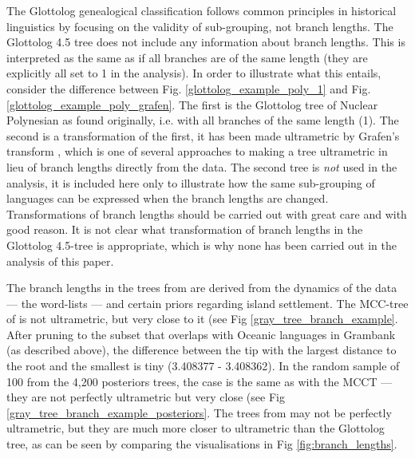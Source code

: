 \documentclass[12pt,letterpaper]{article}
\begin{document}
The Glottolog genealogical classification follows common principles in historical linguistics by focusing on the validity of sub-grouping, not branch lengths. The Glottolog 4.5 tree does not include any information about branch lengths. This is interpreted as the same as if all branches are of the same length (they are explicitly all set to 1 in the analysis). In order to illustrate what this entails, consider the difference between Fig. \ref{glottolog_example_poly_1} and Fig. \ref{glottolog_example_poly_grafen}. The first is the Glottolog tree of Nuclear Polynesian as found originally, i.e. with all branches of the same length (1). The second is a transformation of the first, it has been made ultrametric by Grafen's transform \citep{grafen1989phylogenetic}, which is one of several approaches to making a tree ultrametric in lieu of branch lengths directly from the data. The second tree is \emph{not} used in the analysis, it is included here only to illustrate how the same sub-grouping of languages can be expressed when the branch lengths are changed. Transformations of branch lengths should be carried out with great care and with good reason. It is not clear what transformation of branch lengths in the Glottolog 4.5-tree is appropriate, which is why none has been carried out in the analysis of this paper.

The branch lengths in the trees from \citet{grayetal_2009} are derived from the dynamics of the data --- the word-lists --- and certain priors regarding island settlement. The MCC-tree of \citet{grayetal_2009} is not ultrametric, but very close to it (see Fig \ref{gray_tree_branch_example}. After pruning to the subset that overlaps with Oceanic languages in Grambank (as described above), the difference between the tip with the largest distance to the root and the smallest is tiny (3.408377 -  3.408362). In the random sample of 100 from the 4,200 posteriors trees, the case is the same as with the MCCT --- they are not perfectly ultrametric but very close (see Fig \ref{gray_tree_branch_example_posteriors}. The trees from \citet{grayetal_2009} may not be perfectly ultrametric, but they are much more closer to ultrametric than the Glottolog tree, as can be seen by comparing the visualisations in Fig \ref{fig:branch_lengths}.
\end{document}
